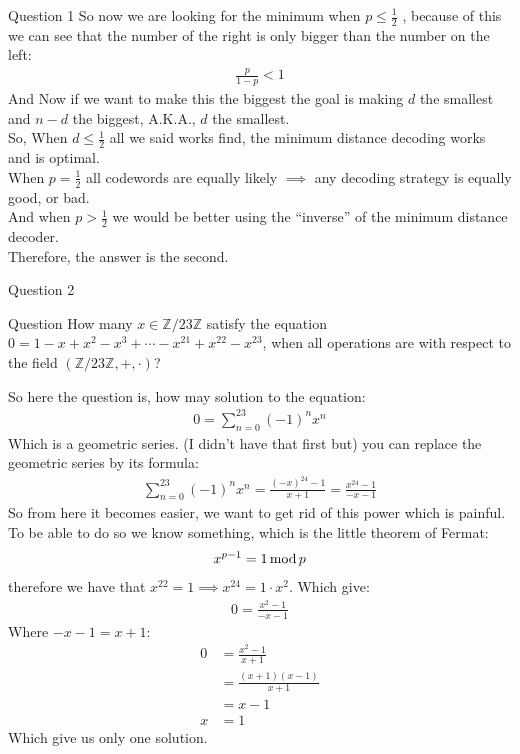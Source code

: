 \begin{parag}{Question 1}
        So now we are looking for the minimum when $p \leq \frac{1}{2}$ , because of this we can see that the number of the right is only bigger than the number on the left:
        \begin{align*} \frac{p}{1-p} < 1 \end{align*}
        And Now if we want to make this the biggest the goal is making $d$ the smallest and $n-d$ the biggest, A.K.A., $d$ the smallest.\\
        So, When $d \leq \frac{1}{2}$ all we said works find, the minimum distance decoding works and is optimal.\\
    When $p = \frac{1}{2}$ all codewords are equally likely $\implies$ any decoding strategy is equally good, or bad.\\
    And when $p > \frac{1}{2}$ we would be better using the ``inverse'' of the minimum distance decoder.\\
    Therefore, the answer is the second.

\end{parag}
\begin{parag}{Question 2}
   \begin{subparag}{Question}
       How many $x \in \mathbb{Z} / 23 \mathbb{Z}$ satisfy the equation $0 =  1 -x + x^2 - x^3 + \cdots -x^{21} + x^{22} - x^{23}$, when all operations are with respect to the field $ \left(\mathbb{Z} / 23 \mathbb{Z}, +, \cdot \right)$? 
   \end{subparag} 
   So here the question is, how may solution to the equation:
   \begin{align*} 0 = \sum_{n = 0}^{23} \left(-1\right)^nx^n \end{align*}
   Which is a geometric series. (I didn't have that first but) you can replace the geometric series by its formula:
   \begin{align*} \sum_{n = 0}^{23} \left(-1\right)^nx^n = \frac{\left(-x\right)^{24} - 1}{x + 1}= \frac{x^{24} - 1}{- x - 1} \end{align*}
So from here it becomes easier, we want to get rid of this  power which is painful. To be able to do so we know something, which is the little theorem of Fermat:
\begin{align*} x^{p-1} = 1 \operatorname{mod} p \end{align*}
therefore we have that $x^22 =  1 \implies x^{24} = 1\cdot x^2$. Which give:
\begin{align*} 0 = \frac{x^2-1 }{-x -1} \end{align*}
Where $-x - 1 = x + 1$:\\
\begin{align*} 
    0 &=  \frac{x^2 - 1}{x + 1}\\
      &= \frac{\left(x + 1\right)\left(x-1\right)}{x+1}\\
      &= x - 1\\
    x &= 1
\end{align*}
Which give us only one solution.
\end{parag}
